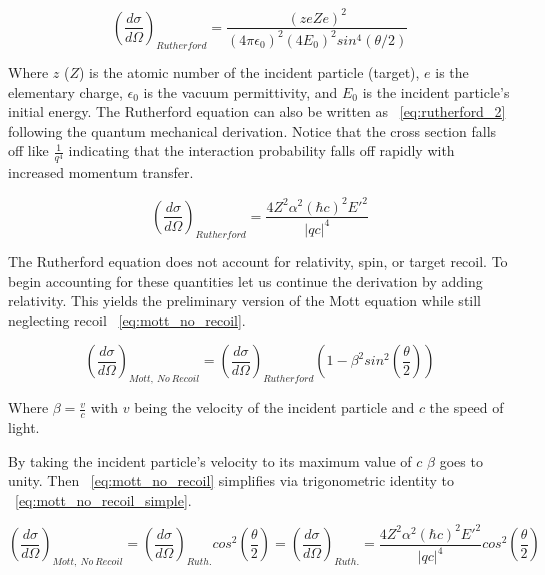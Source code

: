 \begin{equation} \label{eq:rutherford}
	\left(\frac{d\sigma}{d\Omega}\right)_{Rutherford} = \frac{\left(zeZe\right)^2}{(4\pi\epsilon_0)^2(4E_0)^2sin^4(\theta/2)}
\end{equation}

\noindent Where $z$ ($Z$) is the atomic number of the incident particle (target), $e$ is the elementary charge, $\epsilon_0$ is the vacuum permittivity, and $E_0$ is the incident particle's initial energy. The Rutherford equation can also be written as ~\ref{eq:rutherford_2} following the quantum mechanical derivation. Notice that the cross section falls off like $\frac{1}{q^4}$ indicating that the interaction probability falls off rapidly with increased momentum transfer.

\begin{equation} \label{eq:rutherford_2}
	\left(\frac{d\sigma}{d\Omega}\right)_{Rutherford} = \frac{4Z^2\alpha^2\left(\hbar c\right)^2E'^2}{|qc|^4}
\end{equation}

The Rutherford equation does not account for relativity, spin, or target recoil. To begin accounting for these quantities let us continue the derivation by adding relativity. This yields the preliminary version of the Mott equation while still neglecting recoil ~\ref{eq:mott_no_recoil}.

\begin{equation} \label{eq:mott_no_recoil}
	\left(\frac{d\sigma}{d\Omega}\right)_{Mott, \: No \: Recoil} = \left(\frac{d\sigma}{d\Omega}\right)_{Rutherford} \left( 1-\beta^2 sin^2 \left( \frac{\theta}{2} \right) \right)
\end{equation}

\noindent Where $\beta = \frac{v}{c}$ with $v$ being the velocity of the incident particle and $c$ the speed of light. 

By taking the incident particle's velocity to its maximum value of $c$ $\beta$ goes to unity. Then ~\ref{eq:mott_no_recoil} simplifies via trigonometric identity to ~\ref{eq:mott_no_recoil_simple}.

\begin{equation} \label{eq:mott_no_recoil_simple}
	\left(\frac{d\sigma}{d\Omega}\right)_{Mott, \: No \: Recoil} = \left(\frac{d\sigma}{d\Omega}\right)_{Ruth.} cos^2 \left( \frac{\theta}{2} \right) = \left(\frac{d\sigma}{d\Omega}\right)_{Ruth.} = \frac{4Z^2\alpha^2\left(\hbar c\right)^2E'^2}{|qc|^4} cos^2 \left( \frac{\theta}{2} \right) 
\end{equation}

